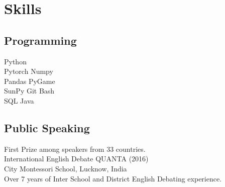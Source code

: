 \documentclass[]{raahul_singh_resume}
\begin{document}
\begin{minipage}[t]{0.33\textwidth}
\section{Skills}
\subsection{Programming}
Python \\
Pytorch  \textbullet{} Numpy \\
Pandas  \textbullet{} PyGame  \\
SunPy \textbullet{}
Git  \textbullet{} Bash \\
SQL  \textbullet{} Java
\sectionsep

\subsection{Public Speaking}
\textbullet{} First Prize among speakers from 33 countries. \\
International English Debate QUANTA (2016) \\
City Montessori School, Lucknow, India \\
\textbullet{} Over 7 years of Inter School and District English Debating experience.
\sectionsep

\end{minipage} 
\hfill
\end{document}
